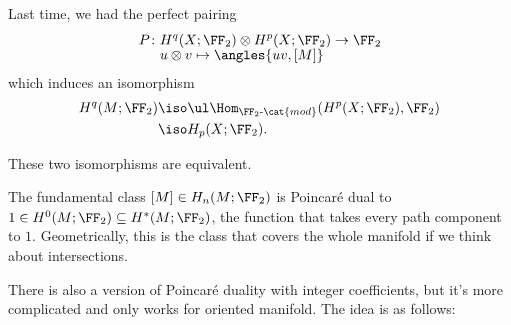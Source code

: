 \documentclass{standalone}
\begin{document}
Last time, we had the perfect pairing
\begin{align*}
  P \colon& H^q(X; \FF_2) \otimes H^p(X; \FF_2) \to \FF_2 \\[-1ex]
    & u \otimes v \mapsto \angles{uv, [M]}
\end{align*}
which induces an isomorphism
\begin{align*}
  H^q(M; \FF_2)
    &\iso \ul\Hom_{\FF_2\text{-}\cat{mod}}(H^p(X; \FF_2), \FF_2) \\ %
    &\iso H_p(X; \FF_2).
\end{align*}

\begin{claim}
  These two isomorphisms are equivalent.
\end{claim}

\begin{remark}
  The fundamental class \([M] \in H_n(M; \FF_2)\) is Poincar\'e dual to
  \(1 \in H^0(M; \FF_2) \subseteq H^*(M; \FF_2)\),
  the function that takes every path component to \(1\).
  Geometrically, this is the class that covers the whole manifold
  if we think about intersections.
\end{remark}

There is also a version of Poincar\'e duality with integer coefficients,
but it's more complicated and only works for oriented manifold.
The idea is as follows:
\end{document}
